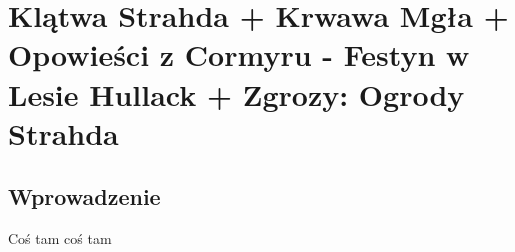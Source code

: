 \clearpage

\part{Klątwa Strahda + Krwawa Mgła + Opowieści z Cormyru - Festyn w Lesie Hullack + Zgrozy: Ogrody Strahda}

\chapter{Wprowadzenie}

Coś tam coś tam
